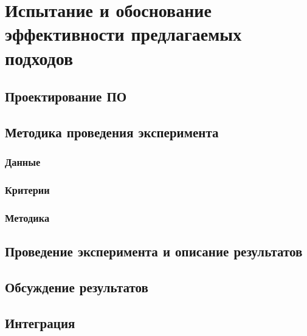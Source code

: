 \chapter{Испытание и обоснование эффективности предлагаемых подходов}
\section{Проектирование ПО}
\section{Методика проведения эксперимента}
\subsection{Данные}
\subsection{Критерии}
\subsection{Методика}
\section{Проведение эксперимента и описание результатов}
\section{Обсуждение результатов}
\section{Интеграция}